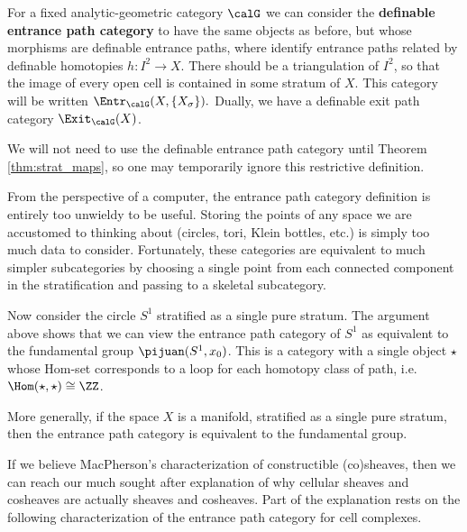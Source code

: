 \begin{defn}
	For a fixed analytic-geometric category $\calG$ we can consider the \textbf{definable entrance path category} to have the same objects as before, but whose morphisms are definable entrance paths, where identify entrance paths related by definable homotopies $h:I^2\to X$. There should be a triangulation of $I^2$, so that the image of every open cell is contained in some stratum of $X$. This category will be written $\Entr_{\calG}(X,\{X_{\sigma}\}).$ Dually, we have a definable exit path category $\Exit_{\calG}(X)$.
\end{defn}
\begin{rmk}
	We will not need to use the definable entrance path category until Theorem \ref{thm:strat_maps}, so one may temporarily ignore this restrictive definition. 
\end{rmk}

From the perspective of a computer, the entrance path category definition is entirely too unwieldy to be useful. Storing the points of any space we are accustomed to thinking about (circles, tori, Klein bottles, etc.) is simply too much data to consider. Fortunately, these categories are equivalent to much simpler subcategories by choosing a single point from each connected component in the stratification and passing to a skeletal subcategory.

\begin{ex}
 Now consider the circle $S^1$ stratified as a single pure stratum. The argument above shows that we can view the entrance path category of $S^1$ as equivalent to the fundamental group $\pijuan(S^1,x_0)$. This is a category with a single object $\star$ whose Hom-set corresponds to a loop for each homotopy class of path, i.e. $\Hom(\star,\star)\cong\ZZ$.
\end{ex}

\begin{ex}[Manifolds]
More generally, if the space $X$ is a manifold, stratified as a single pure stratum, then the entrance path category is equivalent to the fundamental group.
\end{ex}

If we believe MacPherson's characterization of constructible (co)sheaves, then we can reach our much sought after explanation of why cellular sheaves and cosheaves are actually sheaves and cosheaves. Part of the explanation rests on the following characterization of the entrance path category for cell complexes.

